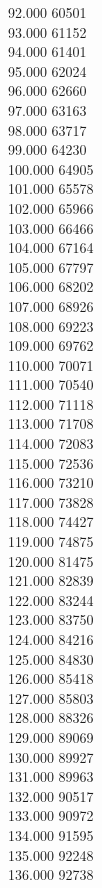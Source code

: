 { 92.000	60501 \\
 93.000	61152 \\
 94.000	61401 \\
 95.000	62024 \\
 96.000	62660 \\
 97.000	63163 \\
 98.000	63717 \\
 99.000	64230 \\
 100.000	64905 \\
 101.000	65578 \\
 102.000	65966 \\
 103.000	66466 \\
 104.000	67164 \\
 105.000	67797 \\
 106.000	68202 \\
 107.000	68926 \\
 108.000	69223 \\
 109.000	69762 \\
 110.000	70071 \\
 111.000	70540 \\
 112.000	71118 \\
 113.000	71708 \\
 114.000	72083 \\
 115.000	72536 \\
 116.000	73210 \\
 117.000	73828 \\
 118.000	74427 \\
 119.000	74875 \\
 120.000	81475 \\
 121.000	82839 \\
 122.000	83244 \\
 123.000	83750 \\
 124.000	84216 \\
 125.000	84830 \\
 126.000	85418 \\
 127.000	85803 \\
 128.000	88326 \\
 129.000	89069 \\
 130.000	89927 \\
 131.000	89963 \\
 132.000	90517 \\
 133.000	90972 \\
 134.000	91595 \\
 135.000	92248 \\
 136.000	92738 \\
}
